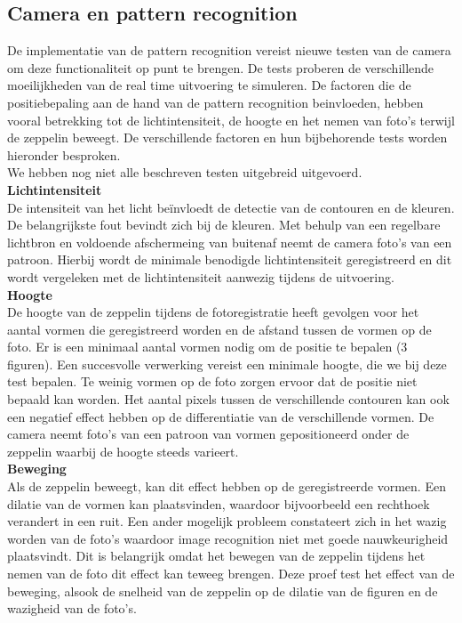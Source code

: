 \documentclass[tt]{penoverslag}
\begin{document}
\subsection{Camera en pattern recognition}
De implementatie van de pattern recognition vereist nieuwe testen van de camera om deze functionaliteit op punt te brengen. De tests proberen de verschillende moeilijkheden van de real time uitvoering te simuleren. De factoren die de positiebepaling aan de hand van de pattern recognition beinvloeden, hebben vooral betrekking tot de lichtintensiteit, de hoogte en het nemen van foto’s terwijl de zeppelin beweegt. De verschillende factoren en hun bijbehorende tests worden hieronder besproken.
\\
We hebben nog niet alle beschreven testen uitgebreid uitgevoerd.\\

\textbf{Lichtintensiteit}\\
De intensiteit van het licht be\"{i}nvloedt de detectie van de contouren en de kleuren. De belangrijkste fout bevindt zich bij de kleuren. Met behulp van een regelbare lichtbron en voldoende afschermeing van buitenaf neemt de camera foto’s van een patroon. Hierbij wordt de minimale benodigde lichtintensiteit geregistreerd en dit wordt vergeleken met de lichtintensiteit aanwezig tijdens de uitvoering. \\

\textbf{Hoogte}\\
De hoogte van de zeppelin tijdens de fotoregistratie heeft gevolgen voor het aantal vormen die geregistreerd worden en de afstand tussen de vormen op de foto. Er is een minimaal aantal vormen nodig om de positie te bepalen (3 figuren). Een succesvolle verwerking vereist een minimale hoogte, die we bij deze test bepalen. Te weinig vormen op de foto zorgen ervoor dat de positie niet bepaald kan worden. Het aantal pixels tussen de verschillende contouren kan ook een negatief effect hebben op de differentiatie van de verschillende vormen. De camera neemt foto’s van een patroon van vormen gepositioneerd onder de zeppelin waarbij de hoogte steeds varieert.\\ 

\textbf{Beweging}\\
Als de zeppelin beweegt, kan dit effect hebben op de geregistreerde vormen. Een dilatie van de vormen kan plaatsvinden, waardoor bijvoorbeeld een rechthoek verandert in een ruit. Een ander mogelijk probleem constateert zich in het wazig worden van de foto’s waardoor image recognition niet met goede nauwkeurigheid plaatsvindt. Dit is belangrijk omdat het bewegen van de zeppelin tijdens het nemen van de foto dit effect kan teweeg brengen. Deze proef test het effect van de beweging, alsook de snelheid van de zeppelin op de dilatie van de figuren en de wazigheid van de foto’s.  \\
\end{document}
